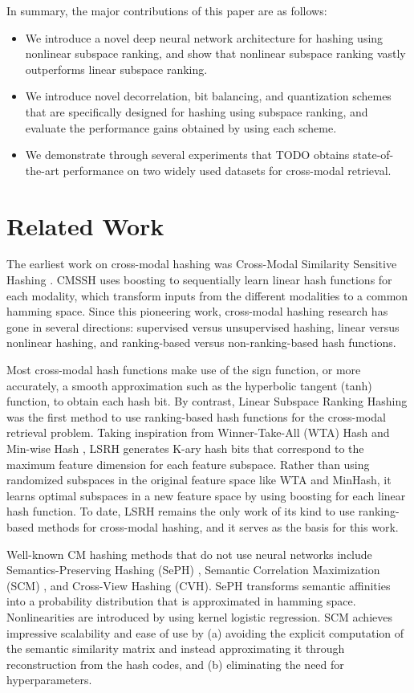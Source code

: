 \documentclass[letterpaper]{article}
\begin{document}
In summary, the major contributions of this paper are as follows:
\begin{itemize}
	\item We introduce a novel deep neural network architecture for hashing using nonlinear subspace ranking, and show that nonlinear subspace ranking vastly outperforms linear subspace ranking. 
	\item We introduce novel decorrelation, bit balancing, and quantization schemes that are specifically designed for hashing using subspace ranking, and evaluate the performance gains obtained by using each scheme.
	\item We demonstrate through several experiments that TODO obtains state-of-the-art performance on two widely used datasets for cross-modal retrieval.
\end{itemize}


\section{Related Work}

The earliest work on cross-modal hashing was Cross-Modal Similarity Sensitive Hashing \cite{cmssh}. CMSSH uses boosting to sequentially learn linear hash functions for each modality, which transform inputs from the different modalities to a common hamming space. Since this pioneering work, cross-modal hashing research has gone in several directions: supervised versus unsupervised hashing, linear versus nonlinear hashing, and ranking-based versus non-ranking-based hash functions.

Most cross-modal hash functions make use of the sign function, or more accurately, a smooth approximation such as the hyperbolic tangent (tanh) function, to obtain each hash bit. By contrast, Linear Subspace Ranking Hashing \cite{kai} was the first method to use ranking-based hash functions for the cross-modal retrieval problem. Taking inspiration from Winner-Take-All (WTA) Hash \cite{wta} and Min-wise Hash \cite{minhash}, LSRH generates K-ary hash bits that correspond to the maximum feature dimension for each feature subspace. Rather than using randomized subspaces in the original feature space like WTA and MinHash, it learns optimal subspaces in a new feature space by using boosting for each linear hash function. To date, LSRH remains the only work of its kind to use ranking-based methods for cross-modal hashing, and it serves as the basis for this work.

Well-known CM hashing methods that do not use neural networks include Semantics-Preserving Hashing (SePH) \cite{seph}, Semantic Correlation Maximization (SCM) \cite{scm}, and Cross-View Hashing (CVH). SePH transforms semantic affinities into a probability distribution that is approximated in hamming space. Nonlinearities are introduced by using kernel logistic regression. SCM achieves impressive scalability and ease of use by (a) avoiding the explicit computation of the semantic similarity matrix and instead approximating it through reconstruction from the hash codes, and (b) eliminating the need for hyperparameters.
\end{document}
